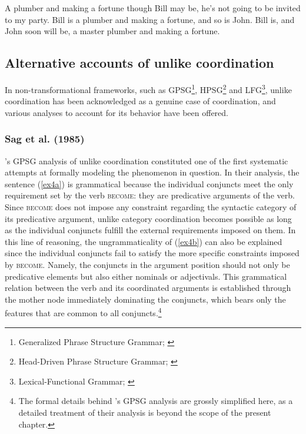 \pex
\label{ex3}
\a\label{ex3a}A plumber and making a fortune though Bill may be, he's not
going to be invited to my party. 
\a\label{ex3b}Bill is a plumber and making a fortune, and so is John. 
\a\label{ex3c}Bill is, and John soon will be, a master plumber and making a
fortune. 
\xe

\subsection{Alternative accounts of unlike coordination}
In non-transformational frameworks, such as GPSG\footnote{Generalized Phrase Structure Grammar; \citealp{gazdaretal1985}}, HPSG\footnote{Head-Driven Phrase Structure Grammar; \citealp{pollardetal1994, muller:2021}} and LFG\footnote{Lexical-Functional Grammar; \citealp{kaplan&bresnan_1982, Dalrymple2019}}, unlike coordination has been acknowledged as a genuine case of coordination, and various analyses to account for its behavior have been offered.

\subsubsection{Sag et al. (1985)}
\citeauthor{sagetal1985}'s \citeyearpar{sagetal1985} GPSG analysis of unlike coordination constituted one of the first systematic attempts at formally modeling the phenomenon in question. In their analysis, the sentence (\ref{ex4a}) is grammatical because the individual conjuncts meet the only requirement set by the verb \textsc{become}: they are predicative arguments of the verb. Since \textsc{become} does not impose any constraint regarding the syntactic category of its predicative argument, unlike category coordination becomes possible as long as the individual conjuncts fulfill the external requirements imposed on them. In this line of reasoning, the ungrammaticality of (\ref{ex4b}) can also be explained since the individual conjuncts fail to satisfy the more specific constraints imposed by \textsc{become}. Namely, the conjuncts in the argument position should not only be predicative elements but also either nominals or adjectivals. This grammatical relation between the verb and its coordinated arguments is established through the mother node immediately dominating the conjuncts, which bears only the features that are common to all conjuncts.\footnote{The formal details behind \citeauthor{sagetal1985}'s GPSG analysis are grossly simplified here, as a detailed treatment of their analysis is beyond the scope of the present chapter.} 

